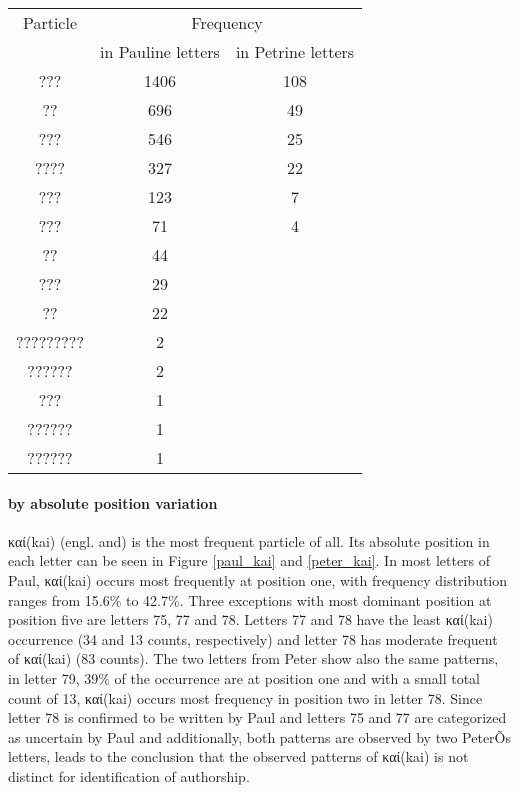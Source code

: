 \documentclass[a4paper]{article}
\begin{document}
{\renewcommand{\arraystretch}{1.3}
\begin{tabular}{ccc}
\hline
Particle &	\multicolumn{2}{c}{Frequency} \\
\cline{2-3}
&in Pauline letters  & in Petrine letters \\
\hline
??? & 1406 & 108 \\
??	& 696 & 49 \\
???	& 546 &25 \\
????	 & 327&22 \\
???	& 123 &7 \\
???  & 71 & 4 \\
??    & 44&	\\
???  & 29	& \\
??    & 22	& \\
????????? & 2	& \\
?????? &	2& \\	
???  & 1	& \\
?????? & 1 &\\
?????? & 1&	\\
\hline
\end{tabular}
}

\paragraph{by absolute position variation}
\textgreek{καί}(kai) (engl. and) is the most frequent particle of all. Its absolute position in each letter can be seen in Figure \ref{paul_kai} and \ref{peter_kai}. In most letters of Paul, \textgreek{καί}(kai) occurs most frequently at position one, with frequency distribution ranges from 15.6\%  to 42.7\%. Three exceptions with most dominant position at position five are letters 75, 77 and 78. Letters 77 and 78 have the least \textgreek{καί}(kai) occurrence (34 and 13 counts, respectively) and letter 78 has moderate frequent of \textgreek{καί}(kai) (83 counts). The two letters from Peter show also the same patterns, in letter 79, 39\% of the occurrence are at position one and with a small total count of 13, \textgreek{καί}(kai) occurs most frequency in position two in letter 78. Since letter 78 is confirmed to be written by Paul and letters 75 and 77 are categorized as uncertain by Paul and additionally, both patterns are observed by two PeterÕs letters, leads to the conclusion that the observed patterns of \textgreek{καί}(kai) is not distinct for identification of authorship.\\
\end{document}
